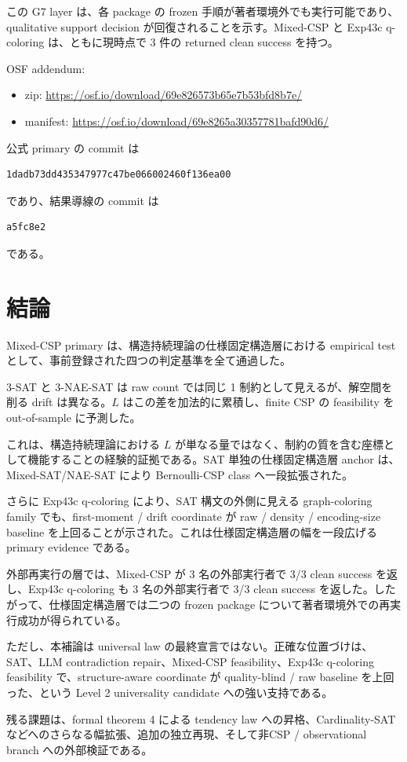 \documentclass[12pt,a4paper]{article}
\begin{document}
この G7 layer は、各 package の frozen 手順が著者環境外でも実行可能であり、qualitative support decision が回復されることを示す。Mixed-CSP と Exp43c q-coloring は、ともに現時点で 3 件の returned clean success を持つ。

OSF addendum:

\begin{itemize}
\tightlist
\item
  zip: \url{https://osf.io/download/69e826573b65e7b53bfd8b7e/}
\item
  manifest: \url{https://osf.io/download/69e8265a30357781bafd90d6/}
\end{itemize}

公式 primary の commit は

\begin{verbatim}
1dadb73dd435347977c47be066002460f136ea00
\end{verbatim}

であり、結果導線の commit は

\begin{verbatim}
a5fc8e2
\end{verbatim}

である。

\section{結論}\label{ux7d50ux8ad6}

Mixed-CSP primary は、構造持続理論の仕様固定構造層における empirical test として、事前登録された四つの判定基準を全て通過した。

3-SAT と 3-NAE-SAT は raw count では同じ 1 制約として見えるが、解空間を削る drift は異なる。\(L\) はこの差を加法的に累積し、finite CSP の feasibility を out-of-sample に予測した。

これは、構造持続理論における \(L\) が単なる量ではなく、制約の質を含む座標として機能することの経験的証拠である。SAT 単独の仕様固定構造層 anchor は、Mixed-SAT/NAE-SAT により Bernoulli-CSP class へ一段拡張された。

さらに Exp43c q-coloring により、SAT 構文の外側に見える graph-coloring family でも、first-moment / drift coordinate が raw / density / encoding-size baseline を上回ることが示された。これは仕様固定構造層の幅を一段広げる primary evidence である。

外部再実行の層では、Mixed-CSP が 3 名の外部実行者で 3/3 clean success を返し、Exp43c q-coloring も 3 名の外部実行者で 3/3 clean success を返した。したがって、仕様固定構造層では二つの frozen package について著者環境外での再実行成功が得られている。

ただし、本補論は universal law の最終宣言ではない。正確な位置づけは、SAT、LLM contradiction repair、Mixed-CSP feasibility、Exp43c q-coloring feasibility で、structure-aware coordinate が quality-blind / raw baseline を上回った、という Level 2 universality candidate への強い支持である。

残る課題は、formal theorem 4 による tendency law への昇格、Cardinality-SAT などへのさらなる幅拡張、追加の独立再現、そして非CSP / observational branch への外部検証である。
\end{document}
